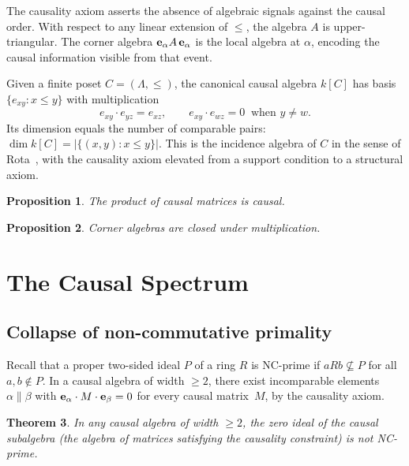 \documentclass[11pt,a4paper]{article}
\theoremstyle{plain}
\newtheorem{theorem}{Theorem}[section]
\newtheorem{proposition}[theorem]{Proposition}
\theoremstyle{definition}
\theoremstyle{remark}
\begin{document}
The causality axiom asserts the absence of algebraic signals against the causal order.
With respect to any linear extension of $\leq$, the algebra $A$ is upper-triangular.
The corner algebra ${\bf e}_\alpha A\, {\bf e}_\alpha$ is the local algebra at $\alpha$, encoding the causal information visible from that event.

Given a finite poset $C = (\Lambda, \leq)$, the canonical causal algebra $k[C]$ has basis $\{e_{xy} : x \leq y\}$ with multiplication
\[
e_{xy} \cdot e_{yz} = e_{xz}, \qquad e_{xy} \cdot e_{wz} = 0 \;\;\text{when } y \neq w.
\]
Its dimension equals the number of comparable pairs: $\dim k[C] = |\{(x,y) : x \leq y\}|$.
This is the incidence algebra of $C$ in the sense of Rota~\cite{rota1964}, with the causality axiom elevated from a support condition to a structural axiom.

\begin{proposition}
The product of causal matrices is causal.
\end{proposition}

\begin{proposition}
Corner algebras are closed under multiplication.
\end{proposition}


\section{The Causal Spectrum}\label{sec:cspec}

\subsection{Collapse of non-commutative primality}

Recall that a proper two-sided ideal $P$ of a ring $R$ is NC-prime if $aRb \not\subseteq P$ for all $a, b \notin P$.
In a causal algebra of width $\geq 2$, there exist incomparable elements $\alpha \| \beta$ with ${\bf e}_\alpha \cdot M \cdot {\bf e}_\beta = 0$ for every causal matrix~$M$, by the causality axiom.

\begin{theorem}\label{thm:collapse}
In any causal algebra of width $\geq 2$, the zero ideal of the causal subalgebra (the algebra of matrices satisfying the causality constraint) is not NC-prime.
\end{theorem}
\end{document}
